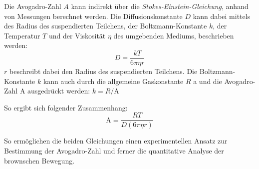 Die Avogadro-Zahl $ A $ kann indirekt über die \textit{Stokes-Einstein-Gleichung}, anhand von Messungen berechnet werden. Die Diffusionskonstante $ D $ kann dabei mittels des Radius des suspendierten Teilchens, der Boltzmann-Konstante  $ k $, der Temperatur $ T $ und der Viskosität $ \eta $ des umgebenden Mediums, beschrieben werden:
\begin{equation}
	D = \frac{kT}{6\pi\eta r}
\end{equation}
$ r $ beschreibt dabei den Radius des suspendierten Teilchens. Die Boltzmann-Konstante $ k $ kann auch durch die allgemeine Gaskonstante $ R $ a und die Avogadro-Zahl $ \mathrm{A} $ ausgedrückt werden: $ k = R/\mathrm{A} $

So ergibt sich folgender Zusammenhang:
\begin{equation}
	\mathrm{A} = \frac{R T}{D (6 \pi \eta r)}
\end{equation}

So ermöglichen die beiden Gleichungen einen experimentellen Ansatz zur Bestimmung der Avogadro-Zahl und ferner die quantitative Analyse der brownschen Bewegung.


